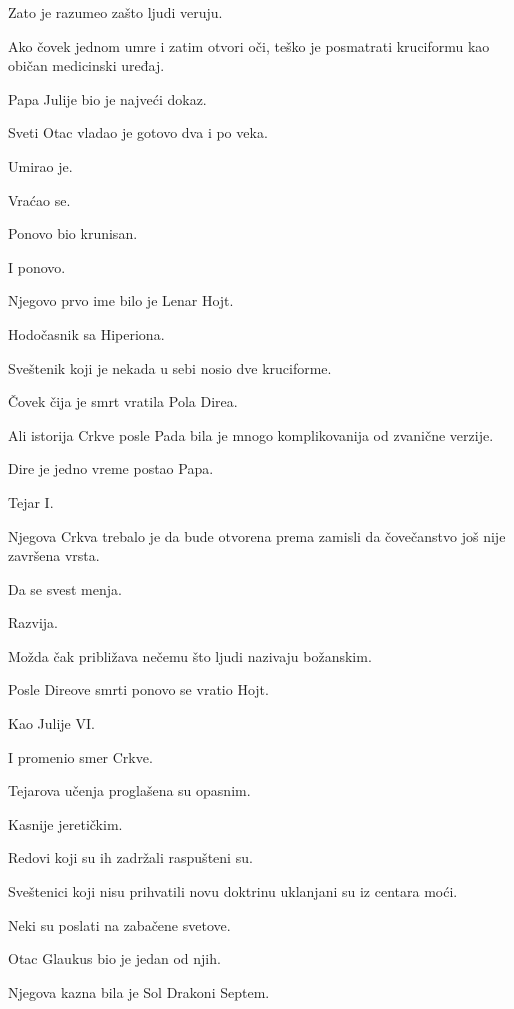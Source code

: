 Zato je razumeo zašto ljudi veruju.

Ako čovek jednom umre i zatim otvori oči, teško je posmatrati kruciformu kao običan medicinski uređaj.

\bigskip

Papa Julije bio je najveći dokaz.

Sveti Otac vladao je gotovo dva i po veka.

Umirao je.

Vraćao se.

Ponovo bio krunisan.

I ponovo.

\bigskip

Njegovo prvo ime bilo je Lenar Hojt.

\bigskip

Hodočasnik sa Hiperiona.

Sveštenik koji je nekada u sebi nosio dve kruciforme.

Čovek čija je smrt vratila Pola Direa.

\bigskip

Ali istorija Crkve posle Pada bila je mnogo komplikovanija od zvanične verzije.

Dire je jedno vreme postao Papa.

Tejar I.

Njegova Crkva trebalo je da bude otvorena prema zamisli da čovečanstvo još nije završena vrsta.

Da se svest menja.

Razvija.

Možda čak približava nečemu što ljudi nazivaju božanskim.

\bigskip

Posle Direove smrti ponovo se vratio Hojt.

Kao Julije VI.

I promenio smer Crkve.

\bigskip

Tejarova učenja proglašena su opasnim.

Kasnije jeretičkim.

Redovi koji su ih zadržali raspušteni su.

Sveštenici koji nisu prihvatili novu doktrinu uklanjani su iz centara moći.

Neki su poslati na zabačene svetove.

\bigskip

Otac Glaukus bio je jedan od njih.

Njegova kazna bila je Sol Drakoni Septem.

